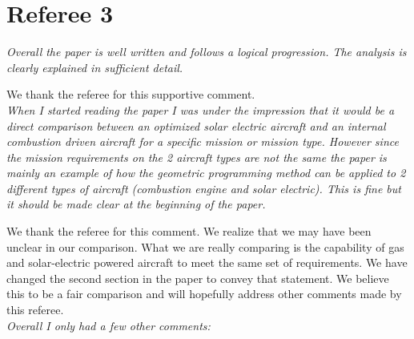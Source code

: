 \documentclass[10pt, a4paper]{article}
\begin{document}
\section*{Referee 3}
\emph{Overall the paper is well written and follows a logical progression. The analysis is clearly explained in sufficient detail. }

    We thank the referee for this supportive comment. \\

\emph{When I started reading the paper I was under the impression that it would be a direct comparison between an optimized solar electric aircraft and an internal combustion driven aircraft for a specific mission or mission type. However since the mission requirements on the 2 aircraft types are not the same the paper is mainly an example of how the geometric programming method can be applied to 2 different types of aircraft (combustion engine and solar electric). This is fine but it should be made clear at the beginning of the paper.}

    We thank the referee for this comment.  We realize that we may have been unclear in our comparison.  What we are really comparing is the capability of gas and solar-electric powered aircraft to meet the same set of requirements.  We have changed the second section in the paper to convey that statement.  We believe this to be a fair comparison and will hopefully address other comments made by this referee. \\

\emph{Overall I only had a few other comments:}
\end{document}

